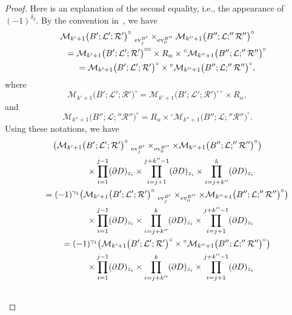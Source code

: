 \documentclass[pdftex]{sigma}
\numberwithin{equation}{section}
\theoremstyle{definition}
\begin{document}
\begin{proof}
Here is an explanation of the second equality, i.e., the appearance of $(-1)^{\delta_2}$.
By the convention in~\cite[Section 8.2]{FOOO09II}, we have
\begin{gather*}
 {\mathcal M}_{k'+1}\bigl(B';{\mathcal L}';{\mathcal R}'\bigr)^{\circ} ~_{{\rm ev}_j^{B'}} \times_{{\rm ev}_0^{B''}}
{\mathcal M}_{k''+1}\bigl(B'';{\mathcal L};''{\mathcal R}''\bigr)^{\circ} \nonumber \\
\qquad{} = {\mathcal M}_{k'+1}\bigl(B';{\mathcal L}';{\mathcal R}'\bigr)^{\circ \circ} \times R_{\alpha} \times
{}^{\circ}{\mathcal M}_{k''+1}\bigl(B'';{\mathcal L};''{\mathcal R}''\bigr)^{\circ} \nonumber \\
\qquad{} = {\mathcal M}_{k'+1}\bigl(B';{\mathcal L}';{\mathcal R}'\bigr)^{\circ} \times {}^{\circ}{\mathcal M}_{k''+1}\bigl(B'';{\mathcal L};''{\mathcal R}''\bigr)^{\circ}, \nonumber
\end{gather*}
where
\[{\mathcal M}_{k'+1}\bigl(B';{\mathcal L}';{\mathcal R}'\bigr)^{\circ} = {\mathcal M}_{k'+1}\bigl(B';{\mathcal L}';{\mathcal R}'\bigr)^{\circ \circ} \times R_{\alpha}, \]
and
\[{\mathcal M}_{k''+1}\bigl(B'';{\mathcal L};''{\mathcal R}''\bigr)^{\circ} = R_{\alpha} \times {}^{\circ}{\mathcal M}_{k''+1}\bigl(B'';{\mathcal L};''{\mathcal R}''\bigr)^{\circ}.\]
Using these notations, we have
\begin{gather*}
\bigl( {\mathcal M}_{k'+1}\bigl(B';{\mathcal L}';{\mathcal R}'\bigr)^{\circ} ~_{{\rm ev}_j^{B'}} \times_{{\rm ev}_0^{B''}} \times{\mathcal M}_{k''+1}\bigl(B'';{\mathcal L};''{\mathcal R}''\bigr)^{\circ} \bigr)\\ \quad\qquad{}
 \times
\prod_{i=1}^{j-1}(\partial D)_{z_i} \times \prod_{i=j+1}^{j+k''-1}(\partial D)_{z_i} \times \prod_{i=j+k''}^k (\partial D)_{z_i}  \\ \qquad{}
= (-1)^{\gamma_1} \bigl( {\mathcal M}_{k'+1}\bigl(B';{\mathcal L}';{\mathcal R}'\bigr)^{\circ} ~_{{\rm ev}_j^{B'}} \times_{{\rm ev}_0^{B''}} \times{\mathcal M}_{k''+1}\bigl(B'';{\mathcal L};''{\mathcal R}''\bigr)^{\circ} \bigr)  \\ \quad\qquad{}
 \times
\prod_{i=1}^{j-1}(\partial D)_{z_i} \times \prod_{i=j+k''}^k (\partial D)_{z_i} \times \prod_{i=j+1}^{j+k''-1}(\partial D)_{z_i}  \\ \qquad{}
= (-1)^{\gamma_1} \bigl( {\mathcal M}_{k'+1}\bigl(B';{\mathcal L}';{\mathcal R}'\bigr)^{\circ} \times {}^{\circ}{\mathcal M}_{k''+1}\bigl(B'';{\mathcal L};''{\mathcal R}''\bigr)^{\circ} \bigr) \\ \quad\qquad{}
  \times
\prod_{i=1}^{j-1}(\partial D)_{z_i} \times \prod_{i=j+k''}^k (\partial D)_{z_i} \times \prod_{i=j+1}^{j+k''-1}(\partial D)_{z_i}  \\ \qquad{}

\end{gather*}
\end{proof}
\end{document}
